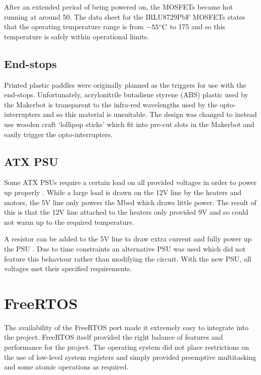 			After an extended period of being powered on, the MOSFETs became hot
			running at around 50\dC. The data sheet for the IRLU8729PbF MOSFETs states
			that the operating temperature range is from $-55^\circ\textrm{C}{}$ to 175\dC{} and so
			this temperature is safely within operational limits.
		
		\subsection{End-stops}
			
			Printed plastic paddles were originally planned as the triggers for use
			with the end-stops. Unfortunately, acrylonitrile butadiene styrene (ABS)
			plastic used by the Makerbot is transparent to the infra-red wavelengths
			used by the opto-interrupters and so this material is unsuitable. The
			design was changed to instead use wooden craft `lollipop sticks' which fit
			into pre-cut slots in the Makerbot and easily trigger the
			opto-interrupters.
		
		\subsection{ATX PSU}
			
			Some ATX PSUs require a certain load on all provided voltages in order to
			power up properly \cite{reprapatx}. While a large load is drawn on the 12V
			line by the heaters and motors, the 5V line only powers the Mbed which
			draws little power. The result of this is that the 12V line attached to
			the heaters only provided 9V and so could not warm up to the required
			temperature.
			
			A resistor can be added to the 5V line to draw extra current and fully
			power up the PSU \cite{reprapatx}. Due to time constraints an alternative
			PSU was used which did not feature this behaviour rather than modifying
			the circuit. With the new PSU, all voltages met their specified
			requirements.
	
	\section{FreeRTOS}
		
		The availability of the FreeRTOS port made it extremely easy to integrate
		into the project. FreeRTOS itself provided the right balance of features and
		performance for the project. The operating system did not place restrictions
		on the use of low-level system registers and simply provided preemptive
		multitasking and some atomic operations as required.
		
